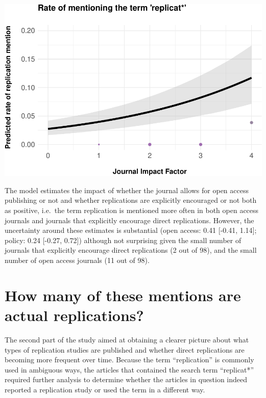 \documentclass[]{elsarticle} %
\begin{document}
\begin{center}\includegraphics[width=1\linewidth]{ReplicationLing_files/figure-latex/plot_mention_jif-1} \end{center}

The model estimates the impact of whether the journal allows for open
access publishing or not and whether replications are explicitly
encouraged or not both as positive, i.e.~the term replication is
mentioned more often in both open access journals and journals that
explicitly encourage direct replications. However, the uncertainty
around these estimates is substantial (open access: 0.41 {[}-0.41,
1.14{]}; policy: 0.24 {[}-0.27, 0.72{]}) although not surprising given
the small number of journals that explicitly encourage direct
replications (2 out of 98), and the small number of open access journals
(11 out of 98).

\hypertarget{how-many-of-these-mentions-are-actual-replications}{%
\section{How many of these mentions are actual
replications?}\label{how-many-of-these-mentions-are-actual-replications}}

The second part of the study aimed at obtaining a clearer picture about
what types of replication studies are published and whether direct
replications are becoming more frequent over time. Because the term
``replication'' is commonly used in ambiguous ways, the articles that
contained the search term ``replicat*'' required further analysis to
determine whether the articles in question indeed reported a replication
study or used the term in a different way.
\end{document}
